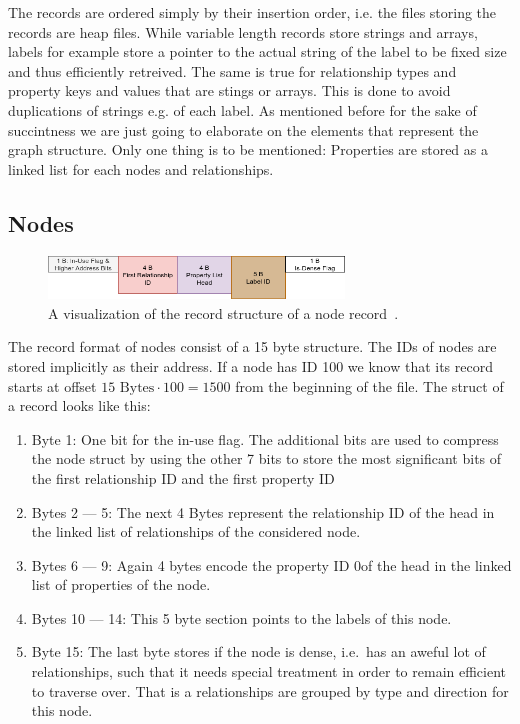         The records are ordered simply by their insertion order, i.e. the files storing the records are heap files.
        While variable length records store strings and arrays, labels for example store a pointer to the actual string of the label to be fixed size and thus efficiently retreived.
        The same is true for relationship types and property keys and values that are stings or arrays.
        This is done to avoid duplications of strings e.g. of each label.
        As mentioned before for the sake of succintness we are just going to elaborate on the elements that represent the graph structure. 
        Only one thing is to be mentioned: 
        Properties are stored as a linked list for each nodes and relationships.
        
        \subsection*{Nodes}
            \begin{figure}[htp]
                \begin{center}
                    \includegraphics[keepaspectratio,height=0.4\textheight,width=0.7\textwidth]{img/03-preliminaries/node_record.png}
                \end{center}
                \caption{A visualization of the record structure of a node record~\autocite{neo4jNodeRecordFormat}.}
                \label{node-record-format}
            \end{figure}
            The record format of nodes consist of a 15 byte structure.
            The IDs of nodes are stored implicitly as their address.
            If a node has ID 100 we know that its record starts at offset $15 \text{ Bytes} \cdot 100 = 1500$ from the beginning of the file.
            The struct of a record looks like this:
            \begin{enumerate}
                \item Byte 1: One bit for the in-use flag. 
                The additional bits are used to compress the node struct by using the other 7 bits to store the most significant bits of the first relationship ID and the first property ID 
                \item Bytes 2 --- 5: The next 4 Bytes represent the relationship ID of the head in the linked list of relationships of the considered node.
                \item Bytes 6 --- 9: Again 4 bytes encode the property ID 0of the head in the linked list of properties of the node.
                \item Bytes 10 --- 14: This 5 byte section points to the labels of this node.
                \item Byte 15: The last byte stores if the node is dense, i.e.\ has an aweful lot of relationships, such that it needs special treatment in order to remain efficient to traverse over.
                That is a relationships are grouped by type and direction for this node.
            \end{enumerate}
            

